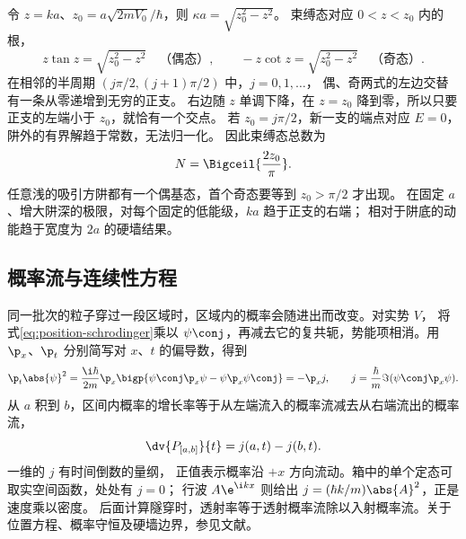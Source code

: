 令 $z=ka$、$z_0=a\sqrt{2mV_0}/\hbar$，则 $\kappa a=\sqrt{z_0^2-z^2}$。
束缚态对应 $0<z<z_0$ 内的根，
\begin{equation}
    z\tan z=\sqrt{z_0^2-z^2}\quad\text{（偶态）},\qquad
    -z\cot z=\sqrt{z_0^2-z^2}\quad\text{（奇态）}.
    \label{eq:finite-well-parity}
\end{equation}
在相邻的半周期 $(j\pi/2,(j+1)\pi/2)$ 中，$j=0,1,\ldots$，
偶、奇两式的左边交替有一条从零递增到无穷的正支。
右边随 $z$ 单调下降，在 $z=z_0$ 降到零，所以只要正支的左端小于 $z_0$，就恰有一个交点。
若 $z_0=j\pi/2$，新一支的端点对应 $E=0$，阱外的有界解趋于常数，无法归一化。
因此束缚态总数为
\begin{equation}
    N=\Bigceil{\frac{2z_0}{\pi}} .
\end{equation}
任意浅的吸引方阱都有一个偶基态，首个奇态要等到 $z_0>\pi/2$ 才出现。
在固定 $a$、增大阱深的极限，对每个固定的低能级，$ka$ 趋于正支的右端；
相对于阱底的动能趋于宽度为 $2a$ 的硬墙结果\cite{mitwave}。

\subsection{概率流与连续性方程}
\label{ss:position-current}
同一批次的粒子穿过一段区域时，区域内的概率会随进出而改变。对实势 $V$，
将式\eqref{eq:position-schrodinger}乘以 $\psi\conj$，再减去它的复共轭，势能项相消。用 $\p_x$、$\p_t$ 分别简写对 $x$、$t$ 的偏导数，得到
\begin{equation}
    \p_t\abs{\psi}^2
    =\frac{\i\hbar}{2m}\p_x
      \bigp{\psi\conj\p_x\psi-\psi\p_x\psi\conj}
    =-\p_x j,\qquad
    j=\frac{\hbar}{m}\Im(\psi\conj\p_x\psi).
    \label{eq:position-current}
\end{equation}
从 $a$ 积到 $b$，区间内概率的增长率等于从左端流入的概率流减去从右端流出的概率流，
\begin{equation}
    \dv{P_{[a,b]}}{t}=j(a,t)-j(b,t).
\end{equation}
一维的 $j$ 有时间倒数的量纲，
正值表示概率沿 $+x$ 方向流动。箱中的单个定态可取实空间函数，处处有 $j=0$；
行波 $A\e^{\i kx}$ 则给出 $j=(\hbar k/m)\abs{A}^2$，正是速度乘以密度。
后面计算隧穿时，透射率等于透射概率流除以入射概率流。关于位置方程、概率守恒及硬墙边界，参见文献\cite{mitwave}。
